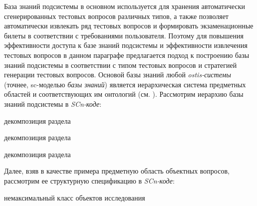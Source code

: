 База знаний подсистемы в основном используется для хранения автоматически сгенерированных тестовых вопросов различных типов, а также позволяет автоматически извлекать ряд тестовых вопросов и формировать экзаменационные билеты в соответствии с требованиями пользователя. Поэтому для повышения эффективности доступа к базе знаний подсистемы и эффективности извлечения тестовых вопросов в данном параграфе предлагается подход к построению базы знаний подсистемы в соответствии с типом тестовых вопросов и стратегией генерации тестовых вопросов. Основой базы знаний любой \textit{ostis-системы} (точнее, sc-моделью \textit{базы знаний}) является иерархическая система предметных областей и соответствующих им онтологий (см. ). Рассмотрим иерархию базы знаний подсистемы в \textit{SCn-коде}:
\begin{SCn}
	
	\begin{scnreltoset}{декомпозиция раздела}
		
		
		\begin{scnreltoset}{декомпозиция раздела}
		\end{scnreltoset}
		
		
		\begin{scnreltoset}{декомпозиция раздела}
		\end{scnreltoset}
		
	\end{scnreltoset}
\end{SCn}

Далее, взяв в качестве примера предметную область объектных вопросов, рассмотрим ее структурную спецификацию в \textit{SCn-коде}:
\begin{SCn}
	\begin{scnhaselementrolelist}{немаксимальный класс объектов исследования}
	\end{scnhaselementrolelist}
\end{SCn}

